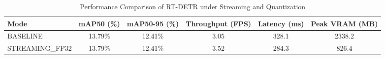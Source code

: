 \begin{table}[h]
\centering
\caption{Performance Comparison of RT-DETR under Streaming and Quantization}
\label{tab:air_detr_perf}
\begin{tabular}{|l|c|c|c|c|c|}
\hline
\textbf{Mode} & \textbf{mAP50 (\%)} & \textbf{mAP50-95 (\%)} & \textbf{Throughput (FPS)} & \textbf{Latency (ms)} & \textbf{Peak VRAM (MB)} \\ \hline
BASELINE & 13.79\% & 12.41\% & 3.05 & 328.1 & 2338.2 \\ \hline
STREAMING_FP32 & 13.79\% & 12.41\% & 3.52 & 284.3 & 826.4 \\ \hline
\end{tabular}
\end{table}